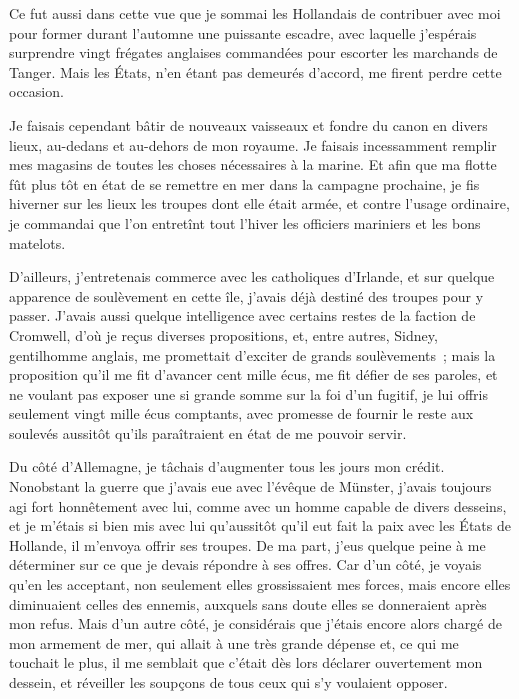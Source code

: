 \documentclass[french,twoside]{book} %
\begin{document}
Ce fut aussi dans cette vue que je sommai les Hollandais de contribuer avec moi pour former durant l’automne une puissante escadre, avec laquelle j’espérais surprendre vingt frégates anglaises commandées pour escorter les marchands de Tanger. Mais les États, n’en étant pas demeurés d’accord, me firent perdre cette occasion.\par
Je faisais cependant bâtir de nouveaux vaisseaux et fondre du canon en divers lieux, au-dedans et au-dehors de mon royaume. Je faisais incessamment remplir mes magasins de toutes les choses nécessaires à la marine. Et afin que ma flotte fût plus tôt en état de se remettre en mer dans la campagne prochaine, je fis hiverner sur les lieux les troupes dont elle était armée, et contre l’usage ordinaire, je commandai que l’on entretînt tout l’hiver les officiers mariniers et les bons matelots.\par
D’ailleurs, j’entretenais commerce avec les catholiques d’Irlande, et sur quelque apparence de soulèvement en cette île, j’avais déjà destiné des troupes pour y passer. J’avais aussi quelque intelligence avec certains restes de la faction de Cromwell, d’où je reçus diverses propositions, et, entre autres, Sidney, gentilhomme anglais, me promettait d’exciter de grands soulèvements ; mais la proposition qu’il me fit d’avancer cent mille écus, me fit défier de ses paroles, et ne voulant pas exposer une si grande somme sur la foi d’un fugitif, je lui offris seulement vingt mille écus comptants, avec promesse de fournir le reste aux soulevés aussitôt qu’ils paraîtraient en état de me pouvoir servir.\par
Du côté d’Allemagne, je tâchais d’augmenter tous les jours mon crédit. Nonobstant la guerre que j’avais eue avec l’évêque de Münster, j’avais toujours agi fort honnêtement avec lui, comme avec un homme capable de divers desseins, et je m’étais si bien mis avec lui qu’aussitôt qu’il eut fait la paix avec les États de Hollande, il m’envoya offrir ses troupes. De ma part, j’eus quelque peine à me déterminer sur ce que je devais répondre à ses offres. Car d’un côté, je voyais qu’en les acceptant, non seulement elles grossissaient mes forces, mais encore elles diminuaient celles des ennemis, auxquels sans doute elles se donneraient après mon refus. Mais d’un autre côté, je considérais que j’étais encore alors chargé de mon armement de mer, qui allait à une très grande dépense et, ce qui me touchait le plus, il me semblait que c’était dès lors déclarer ouvertement mon dessein, et réveiller les soupçons de tous ceux qui s’y voulaient opposer.\par
\end{document}
